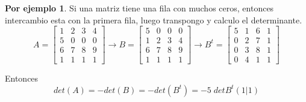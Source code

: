 \documentclass{article}
\theoremstyle{definition}
\theoremstyle{definition}
\newtheorem*{ej}{Por ejemplo}
\theoremstyle{remark}
\begin{document}
\begin{ej}
  Si una matriz tiene una fila con muchos ceros, entonces intercambio esta con la primera fila, luego transpongo y calculo el determinante. \[
    A=\begin{bmatrix} 1 & 2 & 3 & 4 \\ 5 & 0 & 0 & 0 \\ 6 & 7 & 8 & 9 \\ 1 & 1 & 1 & 1 \end{bmatrix} \longrightarrow B=\begin{bmatrix} 5 & 0 & 0 & 0 \\ 1 & 2 & 3 & 4 \\ 6 & 7 & 8 & 9 \\ 1 & 1 & 1 & 1 \end{bmatrix} \longrightarrow B^t= \begin{bmatrix} 5 & 1 & 6 & 1 \\ 0 & 2 & 7 & 1 \\ 0 & 3 & 8 & 1 \\ 0 & 4 & 1 & 1 \end{bmatrix}
  \]
\end{ej}
Entonces \[
  det(A)=-det(B)=-det(B^t)=-5 \; detB^t(1|1)
\]
\pagebreak
\end{document}

